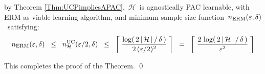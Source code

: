 \begin{enumerate}
	by Theorem \ref{Thm:UCPimpliesAPAC}, \,$\mathcal{H}$\, is
	agnostically PAC learnable, with ERM as viable learning algorithm, and
	minimum sample size function \,$n_{\textnormal{ERM}}(\varepsilon,\delta)$\,
	satisfying:
	\begin{equation*}
	n_{\textnormal{ERM}}(\varepsilon,\delta)
	\;\; \leq \;\;
		n^{\textnormal{UC}}_{\mathcal{H}}(\varepsilon/2,\delta)
	\;\; \leq \;\;
		\left\lceil\;
			\dfrac{
				\log\!\left(\,2\,\vert\,\mathcal{H}\,\vert\,/\,\delta\,\right)
				}{
				2\,(\varepsilon/2)^{2}
				}
			\;\right\rceil
	\;\; = \;\;
		\left\lceil\;
			\dfrac{
				2\,\log\!\left(\,2\,\vert\,\mathcal{H}\,\vert\,/\,\delta\,\right)
				}{
				\varepsilon^{2}
				}
			\;\right\rceil
	\end{equation*}
\end{enumerate}
This completes the proof of the Theorem.
\qed





\renewcommand{\theenumi}{\roman{enumi}}
\renewcommand{\labelenumi}{\textnormal{(\theenumi)}$\;\;$}

